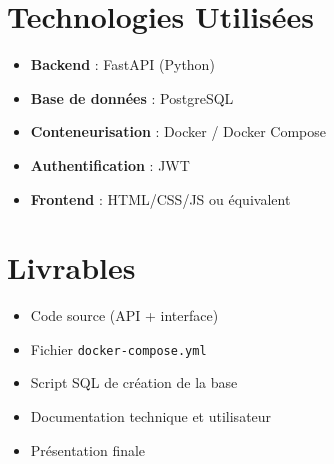 \documentclass[a4paper,12pt]{article}
\begin{document}
\section{Technologies Utilisées}
\begin{itemize}
    \item \textbf{Backend} : FastAPI (Python)
    \item \textbf{Base de données} : PostgreSQL
    \item \textbf{Conteneurisation} : Docker / Docker Compose
    \item \textbf{Authentification} : JWT
    \item \textbf{Frontend} : HTML/CSS/JS ou équivalent
\end{itemize}

\section{Livrables}
\begin{itemize}
    \item Code source (API + interface)
    \item Fichier \texttt{docker-compose.yml}
    \item Script SQL de création de la base
    \item Documentation technique et utilisateur
    \item Présentation finale
\end{itemize}
\end{document}
